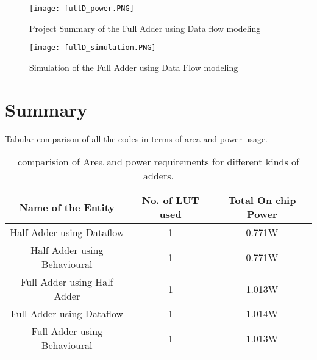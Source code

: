 \begin{figure}[h!]
\centering
\texttt{[image: fullD\_power.PNG]}
\caption{Project Summary of the Full Adder using Data flow modeling}
\label{figure:2}


\end{figure}


\begin{figure}[h!]
\centering
\texttt{[image: fullD\_simulation.PNG]}
\caption{Simulation of the Full Adder using Data Flow modeling}
\label{figure:3}
\end{figure}


\FloatBarrier   \clearpage

\section{Summary}
Tabular comparison of all the codes in terms of area and power usage. 

\begin{table}[h!]
\centering
\begin{tabular}{|c|c|c|}
\hline
\textbf{Name of the Entity} & \textbf{No. of LUT used} & \textbf{Total On chip Power}\\
\hline
Half Adder using Dataflow & 1 & 0.771W \\ \hline

Half Adder using Behavioural & 1 & 0.771W \\ \hline


Full Adder using Half Adder & 1 & 1.013W \\ \hline

Full Adder using Dataflow & 1 & 1.014W \\ \hline

Full Adder using Behavioural & 1 & 1.013W \\ \hline

\end{tabular}
\caption{comparision of Area and power requirements for different kinds of adders.}
\label{tab:}
\end{table}







